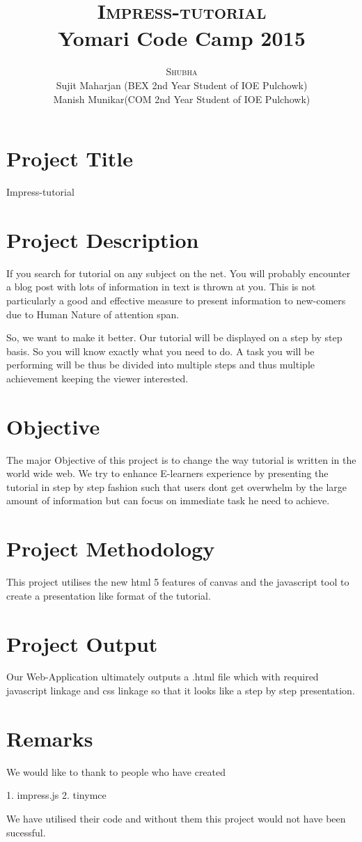 \documentclass[12pt,a4paper]{article}
\title{
  {\Huge{\textsc{Impress-tutorial}}}\\
  {\Large{Yomari Code Camp 2015}}
}
\author{\textsc{Shubha} \\ Sujit Maharjan (BEX 2nd Year Student of IOE Pulchowk) \\ Manish Munikar(COM 2nd Year Student of IOE Pulchowk)}
\begin{document}
\maketitle
\section{Project Title}

Impress-tutorial

\section{Project Description}

If you search for tutorial on any subject on the net. You will probably encounter a blog post with lots of information in text is thrown at you. This is not particularly a good and effective measure to present information to new-comers due to Human Nature of attention span.

So, we want to make it better. Our tutorial will be displayed on a step by step basis. So you will know exactly what you need to do. A task you will be performing will be thus be divided into multiple steps and thus multiple achievement keeping the viewer interested. 

\section{Objective}

The major Objective of this project is to change the way tutorial is written in the world wide web. We try to enhance E-learners experience by presenting the tutorial in step by step fashion such that users dont get overwhelm by the large amount of information but can focus on immediate task he need to achieve. 

\section{Project Methodology}

This project utilises the new html 5 features of canvas and the javascript tool to create a presentation like format of the tutorial.

\section{Project Output}

Our Web-Application ultimately outputs a .html file which with required javascript linkage and css linkage so that it looks like a step by step presentation.

\section{Remarks}

We would like to thank to people who have created 

1. impress.js
2. tinymce

We have utilised their code and without them this project would not have been sucessful.
\end{document}
